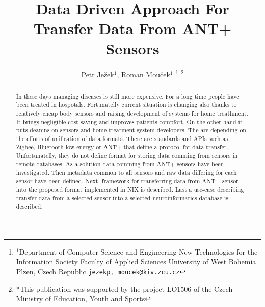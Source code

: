 \documentclass[conference]{IEEEconf}
\begin{document}
  \title{Data Driven Approach For Transfer Data  From ANT+ Sensors}

  \author{{Petr Je\v{z}ek$^{1}$, Roman Mou\v{c}ek$^{1}$}
\thanks{$^{1}$Department of Computer Science and Engineering
New Technologies for the Information Society
Faculty of Applied Sciences
University of West Bohemia
Plzen, Czech Republic
        {\tt\small {jezekp, moucek}@kiv.zcu.cz}}%
\thanks{*This publication was supported by the project LO1506 of the Czech Ministry of Education, Youth and Sports}%
}
\maketitle


\begin{abstract}
In these days managing diseases is still more expensive. For a long time people have been treated in hospotals. Fortunatelly current situation is changing also thanks to relatively cheap body sensors and raising development of systems for home treathment. It brings negligible cost saving and improves patients compfort. On the other hand it puts deamns on sensors and home treatment system developers. The are depending on the efforts of unification of data formats. There are standards and APIs such as Zigbee, Bluetooth low energy or ANT+ that define a protocol for data transfer. Unfortunatelly, they do not define format for storing data comming from sensors in remote databases. As a solution data comming from ANT+ sensors have been investigated. Then metadata common to all sensors and raw data differing for each sensor have been defined. Next, framework for transferring data from ANT+ sensor into the proposed format implemented in NIX is described. Last a use-case describing transfer data from a selected sensor into a selected neuroinformatics database is described.
\end{abstract}
\end{document}
